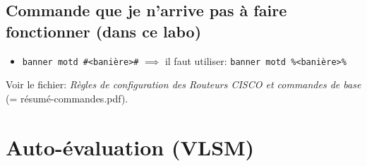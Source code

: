 \documentclass[a4paper]{article}
\begin{document}
\subsection{Commande que je n'arrive pas à faire fonctionner (dans ce labo)}





\begin{itemize}
    \item \texttt{banner motd \#<banière>\#} $ \implies $ il faut utiliser: \texttt{banner motd \%<banière>\%}
\end{itemize}
Voir le fichier: \textit{Règles de configuration des Routeurs CISCO et commandes de base} (= résumé-commandes.pdf).















\section{Auto-évaluation (VLSM)}
\end{document}

